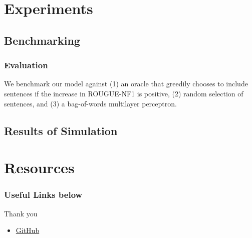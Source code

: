 \documentclass[]{beamer}
\begin{document}
	
\section{Experiments}
	\subsection{Benchmarking}
		\begin{frame}
			\frametitle{Evaluation}
		We benchmark our model against (1) an oracle that greedily chooses to include sentences if the increase in ROUGUE-NF1 is positive,  (2) random selection of sentences,  and (3) a bag-of-words multilayer perceptron.
		\end{frame}

	\subsection{Results of Simulation}
		\begin{frame}
		
		\end{frame}


\section{Resources}
\begin{frame}
	\frametitle{Useful Links below}
	Thank you
	\begin{itemize}
	\item<1-> \href{https://github.com/franciscojavierarceo/DQN-Event-Summarization}{GitHub}
	\end{itemize}
\end{frame}


\end{document}
